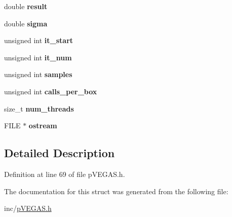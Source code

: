 \begin{DoxyCompactItemize}
\item 
\hypertarget{structpVEGAS_1_1gsl__monte__vegas__state_ab773910457bfec6c983a389d1714c4b6}{double {\bfseries result}}\label{structpVEGAS_1_1gsl__monte__vegas__state_ab773910457bfec6c983a389d1714c4b6}

\item 
\hypertarget{structpVEGAS_1_1gsl__monte__vegas__state_aca33e0298b14ffcb4fbf45df4ca4d41a}{double {\bfseries sigma}}\label{structpVEGAS_1_1gsl__monte__vegas__state_aca33e0298b14ffcb4fbf45df4ca4d41a}

\item 
\hypertarget{structpVEGAS_1_1gsl__monte__vegas__state_ae4e55b3cc72ef59e0a40c47f52976c66}{unsigned int {\bfseries it\-\_\-start}}\label{structpVEGAS_1_1gsl__monte__vegas__state_ae4e55b3cc72ef59e0a40c47f52976c66}

\item 
\hypertarget{structpVEGAS_1_1gsl__monte__vegas__state_aa1a2ebd4a0a5d122a313772428f2a0ea}{unsigned int {\bfseries it\-\_\-num}}\label{structpVEGAS_1_1gsl__monte__vegas__state_aa1a2ebd4a0a5d122a313772428f2a0ea}

\item 
\hypertarget{structpVEGAS_1_1gsl__monte__vegas__state_a60d520a64ceb65614d546bb53a2a6312}{unsigned int {\bfseries samples}}\label{structpVEGAS_1_1gsl__monte__vegas__state_a60d520a64ceb65614d546bb53a2a6312}

\item 
\hypertarget{structpVEGAS_1_1gsl__monte__vegas__state_ac66ba96628f4a1f54086f63723205d0a}{unsigned int {\bfseries calls\-\_\-per\-\_\-box}}\label{structpVEGAS_1_1gsl__monte__vegas__state_ac66ba96628f4a1f54086f63723205d0a}

\item 
\hypertarget{structpVEGAS_1_1gsl__monte__vegas__state_a25f3309b26c45774a9a7f5ab2b79dad1}{size\-\_\-t {\bfseries num\-\_\-threads}}\label{structpVEGAS_1_1gsl__monte__vegas__state_a25f3309b26c45774a9a7f5ab2b79dad1}

\item 
\hypertarget{structpVEGAS_1_1gsl__monte__vegas__state_a7a2be2f94c124e06e0acbdcc824770f9}{F\-I\-L\-E $\ast$ {\bfseries ostream}}\label{structpVEGAS_1_1gsl__monte__vegas__state_a7a2be2f94c124e06e0acbdcc824770f9}

\end{DoxyCompactItemize}


\subsection{Detailed Description}


Definition at line 69 of file p\-V\-E\-G\-A\-S.\-h.



The documentation for this struct was generated from the following file\-:\begin{DoxyCompactItemize}
\item 
inc/\hyperlink{pVEGAS_8h}{p\-V\-E\-G\-A\-S.\-h}\end{DoxyCompactItemize}
